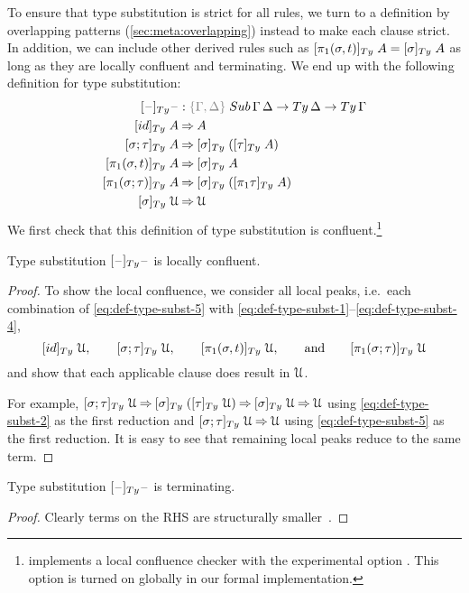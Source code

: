 \documentclass[a4paper,UKenglish,numberwithinsect,cleveref,thm-restate]{lipics-v2021}
\newcommand{\danger}{\marginpar[\hfill\dbend]{\dbend\hfill}}
\begin{document}
To ensure that type substitution is strict for all %
{rules}, we turn to a definition by overlapping patterns (\cref{sec:meta:overlapping}) instead to make each clause strict. 
In addition, we can include other derived rules such as $[\pi_1(\sigma, t)]_{\Ty}\;A = [ \sigma]_{\Ty}\;A$ as long as they are locally confluent and terminating.
We end up with the following definition for type substitution:
\begin{alignat}{3}
[\blank]_{\Ty} \blank            &: \implicit{\Gamma, \Delta} \; \Sub\,\Gamma\,\Delta \to \Ty\,\Delta \to \Ty\,\Gamma \nonumber \\
[ \idS ]_{\Ty}\;A                & \reduce A \label{eq:def-type-subst-1}\\
[ \sigma ; \tau ]_{\Ty}\;A       & \reduce [ \sigma ]_{\Ty}\;([ \tau ]_{\Ty}\;A) \label{eq:def-type-subst-2}\\
[ \pi_1(\sigma, t) ]_{\Ty}\;A    & \reduce [\sigma]_\Ty\;A                       \label{eq:def-type-subst-3} \\
[ \pi_1(\sigma; \tau) ]_{\Ty}\;A & \reduce [\sigma]_\Ty\;([\pi_1\tau]_\Ty\;A)    \label{eq:def-type-subst-4} \\
[ \sigma ]_{\Ty}\;\UU            & \reduce \UU                                   \label{eq:def-type-subst-5}
\end{alignat}
We first check that this definition of type substitution is confluent.\footnote{%
\Agda implements a local confluence checker with the experimental option .
This option is turned on globally in our formal implementation.}
\begin{proposition} \label{prop:local-confluence-1}
  Type substitution $[\blank]_{\Ty}\blank$ is locally confluent.
  \danger
\end{proposition}
\begin{proof}
  To show the local confluence, we consider all local peaks, i.e.\ each combination of \eqref{eq:def-type-subst-5} with \eqref{eq:def-type-subst-1}--\eqref{eq:def-type-subst-4},
  \[
    [\idS]_{\Ty}\;\UU, \qquad [\sigma;\tau]_{\Ty}\;\UU, \qquad [\pi_1(\sigma, t)]_{\Ty}\;\UU, \qquad\text{and}\qquad [\pi_1(\sigma; \tau)]_{\Ty}\;\UU
  \]
  and show that each applicable clause does result in $\mathcal{U}$.

  For example, $[\sigma;\tau]_{\Ty}\;\UU \reduce [\sigma]_{\Ty}\;([\tau]_{\Ty}\;\UU) \reduce [\sigma]_{\Ty}\;\UU \reduce \UU$ using \eqref{eq:def-type-subst-2} as the first reduction and $[\sigma;\tau]_{\Ty}\;\UU \reduce \UU$ using \eqref{eq:def-type-subst-5} as the first reduction.
  It is easy to see that remaining local peaks reduce to the same term.
\end{proof}
\begin{proposition}[Termination]
  Type substitution $[\blank]_{\Ty}\blank$ is terminating.
  \danger
\end{proposition}
\begin{proof}
  Clearly terms on the RHS are structurally smaller~\cite{Abel2002}.
\end{proof}
\end{document}
